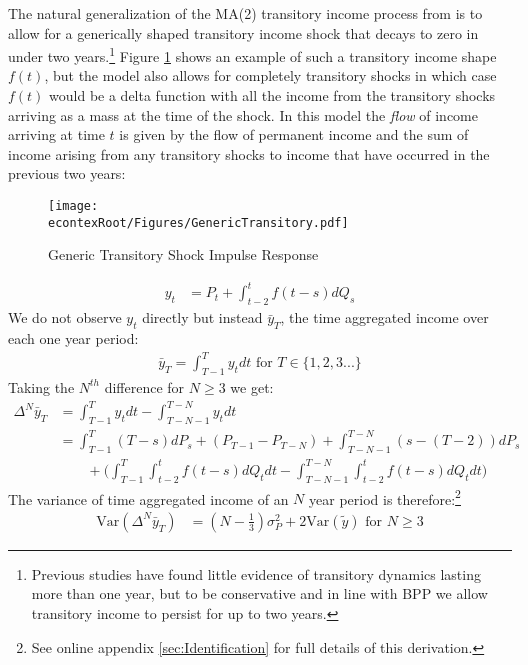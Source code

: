 \documentclass[titlepage]{\econtex}\newcommand{\texname}{ConsumptionHeterogeneity}
\begin{document}
	The natural generalization of the MA(2) transitory income process from \cite{carroll_nature_1997} is to allow for a generically shaped transitory income shock that decays to zero in under two years.\footnote{Previous studies have found little evidence of transitory dynamics lasting more than one year, but to be conservative and in line with BPP we allow transitory income to persist for up to two years.} Figure \ref{fig:GenericTransitory} shows an example of such a transitory income shape $f(t)$, but the model also allows for completely transitory shocks in which case $f(t)$ would be a delta function with all the income from the transitory shocks arriving as a mass at the time of the shock. In this model the \textit{flow} of income arriving at time $t$ is given by the flow of permanent income and the sum of income arising from any transitory shocks to income that have occurred in the previous two years:
	\begin{figure} 
		\begin{centering}
			\texttt{[image: \\econtexRoot/Figures/GenericTransitory.pdf]} 
			\caption{Generic Transitory Shock Impulse Response}
			\label{fig:GenericTransitory}
		\end{centering}
	\end{figure}
	\begin{align*}
	y_t &= P_t + \int_{t-2}^{t} f(t-s)dQ_s
	\end{align*}
	We do not observe $y_t$ directly but instead $\bar{y}_T$, the time aggregated income over each one year period:
	\begin{align}
	\bar{y}_T = \int_{T-1}^{T} y_t dt \text{   for } T \in \{1,2,3...\}\label{income_TA}
	\end{align}
	Taking the $N^{th}$ difference for $N \geq 3$ we get:
	\begingroup
	\allowdisplaybreaks[0]
	\begin{align}
	\Delta^N \bar{y}_T &= \int_{T-1}^{T} y_t dt  - \int_{T-N-1}^{T-N} y_t dt  \nonumber \\ 
	&= \int_{T-1}^{T} (T-s)dP_s  + (P_{T-1} - P_{T-N}) + \int_{T-N-1}^{T-N} (s-(T-2))dP_s \nonumber \\
	& \qquad + \Big(\int_{T-1}^{T} \int_{t-2}^{t} f(t-s)dQ_t dt -\int_{T-N-1}^{T-N}\int_{t-2}^{t} f(t-s) dQ_t dt \Big) \label{deltaNy}
	\end{align}
	\endgroup
	The variance of time aggregated income of an $N$ year period is therefore:\footnote{See online appendix \ref{sec:Identification} for full details of this derivation.}
	\begin{align}
	\mathrm{Var}(\Delta^N \bar{y}_T) &= (N-\frac{1}{3})\sigma^2_P +  2 \mathrm{Var}(\tilde{y}) \text{   for }N \geq 3 \label{variance}
	\end{align}
\end{document}
